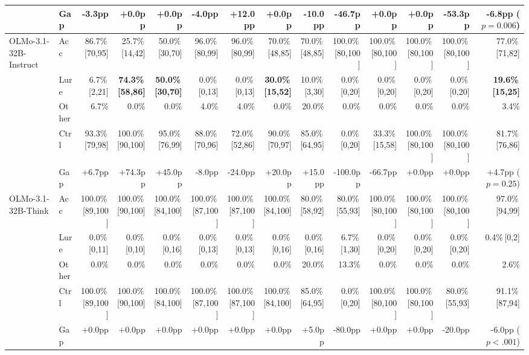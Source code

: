 \begin{table}[t]
{\begin{tabular}{l l r r r r r r r r r r r r}
 & Gap & -3.3pp & +0.0pp & +0.0pp & -4.0pp & +12.0pp & +0.0pp & -10.0pp & -46.7pp & +0.0pp & +0.0pp & -53.3pp & -6.8pp ($p = 0.006$) \\
\midrule
OLMo-3.1-32B-Instruct & Acc & 86.7\%\,{\tiny [70,95]} & 25.7\%\,{\tiny [14,42]} & 50.0\%\,{\tiny [30,70]} & 96.0\%\,{\tiny [80,99]} & 96.0\%\,{\tiny [80,99]} & 70.0\%\,{\tiny [48,85]} & 70.0\%\,{\tiny [48,85]} & 100.0\%\,{\tiny [80,100]} & 100.0\%\,{\tiny [80,100]} & 100.0\%\,{\tiny [80,100]} & 100.0\%\,{\tiny [80,100]} & 77.0\%\,{\tiny [71,82]} \\
 & Lure & 6.7\%\,{\tiny [2,21]} & \textbf{74.3\%\,{\tiny [58,86]}} & \textbf{50.0\%\,{\tiny [30,70]}} & 0.0\%\,{\tiny [0,13]} & 0.0\%\,{\tiny [0,13]} & \textbf{30.0\%\,{\tiny [15,52]}} & 10.0\%\,{\tiny [3,30]} & 0.0\%\,{\tiny [0,20]} & 0.0\%\,{\tiny [0,20]} & 0.0\%\,{\tiny [0,20]} & 0.0\%\,{\tiny [0,20]} & \textbf{19.6\%\,{\tiny [15,25]}} \\
 & Other & 6.7\% & 0.0\% & 0.0\% & 4.0\% & 4.0\% & 0.0\% & 20.0\% & 0.0\% & 0.0\% & 0.0\% & 0.0\% & 3.4\% \\
 & Ctrl & 93.3\%\,{\tiny [79,98]} & 100.0\%\,{\tiny [90,100]} & 95.0\%\,{\tiny [76,99]} & 88.0\%\,{\tiny [70,96]} & 72.0\%\,{\tiny [52,86]} & 90.0\%\,{\tiny [70,97]} & 85.0\%\,{\tiny [64,95]} & 0.0\%\,{\tiny [0,20]} & 33.3\%\,{\tiny [15,58]} & 100.0\%\,{\tiny [80,100]} & 100.0\%\,{\tiny [80,100]} & 81.7\%\,{\tiny [76,86]} \\
 & Gap & +6.7pp & +74.3pp & +45.0pp & -8.0pp & -24.0pp & +20.0pp & +15.0pp & -100.0pp & -66.7pp & +0.0pp & +0.0pp & +4.7pp ($p = 0.25$) \\
\midrule
OLMo-3.1-32B-Think & Acc & 100.0\%\,{\tiny [89,100]} & 100.0\%\,{\tiny [90,100]} & 100.0\%\,{\tiny [84,100]} & 100.0\%\,{\tiny [87,100]} & 100.0\%\,{\tiny [87,100]} & 100.0\%\,{\tiny [84,100]} & 80.0\%\,{\tiny [58,92]} & 80.0\%\,{\tiny [55,93]} & 100.0\%\,{\tiny [80,100]} & 100.0\%\,{\tiny [80,100]} & 100.0\%\,{\tiny [80,100]} & 97.0\%\,{\tiny [94,99]} \\
 & Lure & 0.0\%\,{\tiny [0,11]} & 0.0\%\,{\tiny [0,10]} & 0.0\%\,{\tiny [0,16]} & 0.0\%\,{\tiny [0,13]} & 0.0\%\,{\tiny [0,13]} & 0.0\%\,{\tiny [0,16]} & 0.0\%\,{\tiny [0,16]} & 6.7\%\,{\tiny [1,30]} & 0.0\%\,{\tiny [0,20]} & 0.0\%\,{\tiny [0,20]} & 0.0\%\,{\tiny [0,20]} & 0.4\%\,{\tiny [0,2]} \\
 & Other & 0.0\% & 0.0\% & 0.0\% & 0.0\% & 0.0\% & 0.0\% & 20.0\% & 13.3\% & 0.0\% & 0.0\% & 0.0\% & 2.6\% \\
 & Ctrl & 100.0\%\,{\tiny [89,100]} & 100.0\%\,{\tiny [90,100]} & 100.0\%\,{\tiny [84,100]} & 100.0\%\,{\tiny [87,100]} & 100.0\%\,{\tiny [87,100]} & 100.0\%\,{\tiny [84,100]} & 85.0\%\,{\tiny [64,95]} & 0.0\%\,{\tiny [0,20]} & 100.0\%\,{\tiny [80,100]} & 100.0\%\,{\tiny [80,100]} & 80.0\%\,{\tiny [55,93]} & 91.1\%\,{\tiny [87,94]} \\
 & Gap & +0.0pp & +0.0pp & +0.0pp & +0.0pp & +0.0pp & +0.0pp & +5.0pp & -80.0pp & +0.0pp & +0.0pp & -20.0pp & -6.0pp ($p < .001$) \\
\bottomrule
\end{tabular}}%
\end{table}
